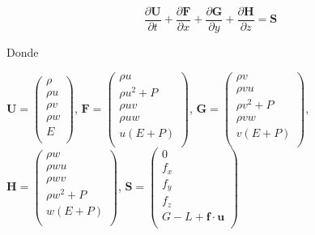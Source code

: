 \documentclass[12pt,a4paper]{book}
\begin{document}
\begin{equation} \label{euler_cartesianas}
\dfrac{\partial \mathbf{U}}{\partial t}+\dfrac{\partial \mathbf{F}}{\partial x}+\dfrac{\partial \mathbf{G}}{\partial y}+\dfrac{\partial \mathbf{H}}{\partial z}= \mathbf{S}
\end{equation}

Donde\\
\begin{center}


$\mathbf{U}=
\left(\begin{smallmatrix}
\rho \\
\rho u \\
\rho v \\
\rho w \\
E \\
\end{smallmatrix}\right)
$,
$\mathbf{F} =
\left(\begin{smallmatrix}
\rho u \\
\rho u^{2}+P \\
\rho uv \\
\rho uw \\
u(E+P) \\
\end{smallmatrix}\right)
$,
$\mathbf{G} =
\left(\begin{smallmatrix}
\rho v\\
\rho vu \\
\rho v^{2}+P \\
\rho vw \\
v(E+P) \\
\end{smallmatrix}\right)
$,
$\mathbf{H} =
\left(\begin{smallmatrix}
\rho w\\
\rho wu \\
\rho wv \\
\rho w^{2}+P \\
w(E+P) \\
\end{smallmatrix}\right)
$, 
$\mathbf{S} =
\left(\begin{smallmatrix}
0 \\
f_{x} \\
f_{y} \\
f_{z} \\
G-L+\textbf{f} \cdot \textbf{u} \\
\end{smallmatrix}\right)
$
\end{center}
\end{document}

